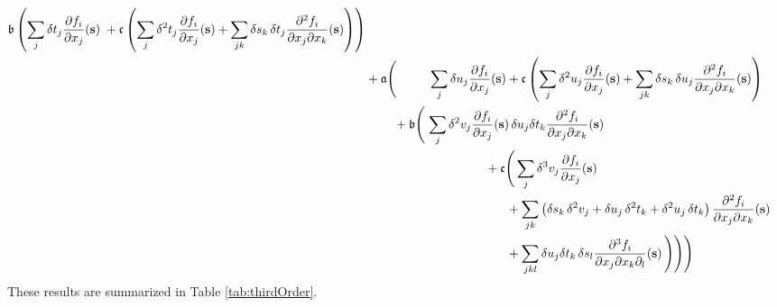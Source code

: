\begin{align*}
\mathfrak{b} \left( \sum_{j} \delta t_{j} \frac{ \partial f_{i} }{ \partial x_{j} } \! \left( \mathbf{s} \right)
\hspace{1mm}
+ \mathfrak{c} \left( 
\sum_{j} \delta^{2} t_{j} 
\frac{ \partial f_{i} }{ \partial x_{j} } \! \left( \mathbf{s} \right) 
+ \sum_{jk} \delta s_{k} \, \delta t_{j} 
\frac{ \partial^{2} f_{i} }{ \partial x_{j} \partial x_{k} } \! \left( \mathbf{s} \right) \right) \right)
\\
&+ 
\mathfrak{a} \Bigg( 
\hspace{9mm}
\sum_{j} \delta u_{j} \frac{ \partial f_{i} }{ \partial x_{j} } \! \left( \mathbf{s} \right)
+ \mathfrak{c} \left( \sum_{j} \delta^{2} u_{j} 
\frac{ \partial f_{i} }{ \partial x_{j} } \! \left( \mathbf{s} \right) 
+ \sum_{jk} \delta s_{k} \, \delta u_{j} 
\frac{ \partial^{2} f_{i} }{ \partial x_{j} \partial x_{k} } \! \left( \mathbf{s} \right) \right)
\\
& 
\hspace{8mm} 
+ \mathfrak{b} \Bigg(
\hspace{0.5mm}
\sum_{j} \delta^{2} v_{j} \frac{ \partial f_{i} }{ \partial x_{j} } \! \left( \mathbf{s} \right)
\delta u_{j} \delta t_{k} 
\frac{ \partial^{2} f_{i} }{ \partial x_{j} \partial x_{k} } \! \left( \mathbf{s} \right)
\\
& \hspace{34mm} 
+ \mathfrak{c} \Bigg(
\sum_{j} \delta^{3} v_{j} 
\frac{ \partial f_{i} }{ \partial x_{j} } \! \left( \mathbf{s} \right) 
\\
& \hspace{40mm} 
+ \sum_{jk}
\left( 
\delta s_{k} \, \delta^{2} v_{j} + \delta u_{j} \, \delta^{2} t_{k} + \delta^{2} u_{j} \, \delta t_{k}  \right)
\frac{ \partial^{2} f_{i} }{ \partial x_{j} \partial x_{k} } \! \left( \mathbf{s} \right) 
\\
& \hspace{40mm} +
\sum_{jkl}
\delta u_{j} \delta t_{k} \, \delta s_{l} 
\frac{ \partial^{3} f_{i} }{ \partial x_{j} \partial x_{k} \partial_{l} } \! \left( \mathbf{s} \right) 
\Bigg)
\Bigg)
\Bigg)
\\
%
\end{align*}
%
These results are summarized in Table \ref{tab:thirdOrder}.

